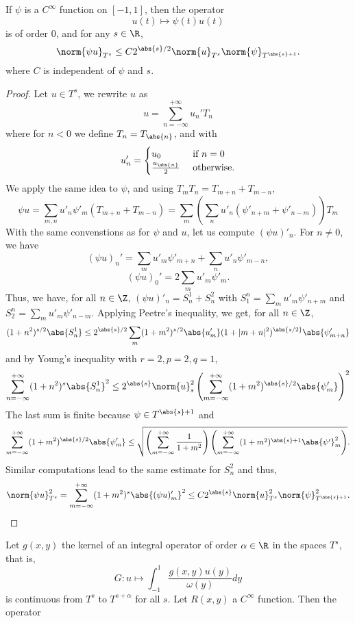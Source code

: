 \documentclass[a4paper]{article}
\begin{document}
	\begin{Prop}
		If $\psi$ is a $C^{\infty}$ function on $[-1,1]$, then the operator
		\[ u(t) \mapsto \psi(t) u(t)\]
		is of order $0$, and for any $s \in \R$, 
		\[ \norm{\psi u}_{T^s} \leq C2^{\abs{s}/2}\norm{u}_{T^s} \norm{\psi}_{T^{\abs{s}+1}}.\]
		where $C$ is independent of $\psi$ and $s$. 
		\begin{proof}
			Let $u \in T^s$, we rewrite $u$ as 
			\[ u = \sum_{n = -\infty}^{+ \infty}u_n'T_n\]
			where for $n< 0$ we define $T_{n} = T_{\abs{n}}$, and with 
			\[u_n' = \begin{cases}
			u_0 & \text{ if } n = 0\\
			\frac{u_{\abs{n}}}{2} & \text{ otherwise.}
			\end{cases}\]
			We apply the same idea to $\psi$, and using $T_m T_n = T_{m+n} + T_{m-n}$, 
			\[\psi u = \sum_{m,n} u'_n \psi'_m (T_{m+n} + T_{m-n}) = \sum_{m} \left(\sum_{n}u'_n(\psi'_{n + m} + \psi'_{n - m})\right) T_m\]
			With the same convenstions as for $\psi$ and $u$, let us compute $(\psi u)'_n$. For $ n \neq 0$, we have
			\[(\psi u)_n' = \sum_{m} u'_m \psi'_{m+n}+\sum_n u'_n \psi'_{m-n},\]
			\[(\psi u)_0' = 2\sum_{m} u'_m \psi'_m.\]
			Thus, we have, for all $n \in \Z$, $(\psi u)'_n = S^1_n + S^2_n$ with $S_1^n = \sum_{m} u'_m \psi'_{n+m}$ and $S_2^n = \sum_m u'_m \psi'_{n - m}$. Applying Peetre's inequality, we get, for all $n \in \Z$, 
			\[(1 + n^2)^{s/2}\abs{S^1_n} \leq 2^{\abs{s}/2}\sum_{m}(1 + m^2)^{s/2} \abs{u'_m}  (1 + |m+n|^2)^{\abs{s/2}} \abs{\psi'_{m+n}} \]
			and by Young's inequality with $r = 2, p = 2, q = 1$, 
			\[\sum_{n = - \infty}^{+ \infty} (1+ n^2)^s \abs{S^1_n}^2 \leq 2^{\abs{s}}\norm{u}_s^2 \left(\sum_{m=-\infty}^{+\infty} (1 + m^2)^{\abs{s}/2}\abs{\psi'_m}\right)^2 \]		
			The last sum is finite because $\psi \in T^{\abs{s}+1}$ and
			\[\sum_{m=-\infty}^{+\infty}(1 + m^2)^{\abs{s}/2} \abs{\psi'_m} \leq \sqrt{\left(\sum_{m = -\infty}^{+ \infty} \frac{1}{1 + m^2} \right)\left(\sum_{m=-\infty}^{+\infty} (1 + m^2)^{\abs{s}+1}\abs{\psi'}_m^2\right)}.\]
			Similar computations lead to the same estimate for $S^2_n$ and thus, 
			\[\norm{\psi u}_{T^s}^2 = \sum_{m = - \infty}^{+ \infty} (1 + m^2)^s \abs{(\psi u)'_m}^2 \leq C 2^{\abs{s}} \norm{u}_{T^s}^2 \norm{\psi}_{T^{\abs{s} + 1}}^2. \]
		\end{proof}
		\begin{Lem}
			Let $g(x,y)$ the kernel of an integral operator of order $\alpha \in \R$ in the spaces $T^s$, that is,
			\[G : u \mapsto \int_{-1}^{1} \frac{g(x,y) u(y)}{\omega(y)}dy\]
			is continuous from $T^s$ to $T^{s + \alpha}$ for all $s$. Let $R(x,y)$ a $C^{\infty}$ function. Then the operator 

\end{Lem}
\end{Prop}
\end{document}
